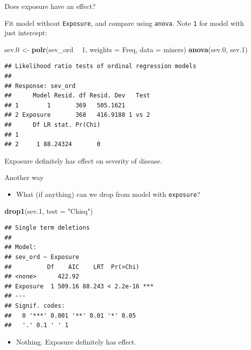 \documentclass[ignorenonframetext,]{beamer}
\newenvironment{Shaded}{\begin{snugshade}}{\end{snugshade}}
\newcommand{\DataTypeTok}[1]{\textcolor[rgb]{0.13,0.29,0.53}{#1}}
\newcommand{\DecValTok}[1]{\textcolor[rgb]{0.00,0.00,0.81}{#1}}
\newcommand{\FloatTok}[1]{\textcolor[rgb]{0.00,0.00,0.81}{#1}}
\newcommand{\KeywordTok}[1]{\textcolor[rgb]{0.13,0.29,0.53}{\textbf{#1}}}
\newcommand{\NormalTok}[1]{#1}
\newcommand{\OperatorTok}[1]{\textcolor[rgb]{0.81,0.36,0.00}{\textbf{#1}}}
\newcommand{\StringTok}[1]{\textcolor[rgb]{0.31,0.60,0.02}{#1}}
\providecommand{\tightlist}{%
  \setlength{\itemsep}{0pt}\setlength{\parskip}{0pt}}
\begin{document}
\begin{frame}[fragile]{Does exposure have an effect?}
\protect\hypertarget{does-exposure-have-an-effect}{}

Fit model without \texttt{Exposure}, and compare using \texttt{anova}.
Note \texttt{1} for model with just intercept:

\small

\begin{Shaded}
\begin{Highlighting}[]
\NormalTok{sev}\FloatTok{.0}\NormalTok{ <-}\StringTok{ }\KeywordTok{polr}\NormalTok{(sev_ord }\OperatorTok{~}\StringTok{ }\DecValTok{1}\NormalTok{, }\DataTypeTok{weights =}\NormalTok{ Freq, }\DataTypeTok{data =}\NormalTok{ miners)}
\KeywordTok{anova}\NormalTok{(sev}\FloatTok{.0}\NormalTok{, sev}\FloatTok{.1}\NormalTok{)}
\end{Highlighting}
\end{Shaded}

\begin{verbatim}
## Likelihood ratio tests of ordinal regression models
## 
## Response: sev_ord
##      Model Resid. df Resid. Dev   Test
## 1        1       369   505.1621       
## 2 Exposure       368   416.9188 1 vs 2
##      Df LR stat. Pr(Chi)
## 1                       
## 2     1 88.24324       0
\end{verbatim}

\normalsize

Exposure definitely has effect on severity of disease.

\end{frame}

\begin{frame}[fragile]{Another way}
\protect\hypertarget{another-way}{}

\begin{itemize}
\tightlist
\item
  What (if anything) can we drop from model with \texttt{exposure}?
\end{itemize}

\begin{Shaded}
\begin{Highlighting}[]
\KeywordTok{drop1}\NormalTok{(sev}\FloatTok{.1}\NormalTok{, }\DataTypeTok{test =} \StringTok{"Chisq"}\NormalTok{)}
\end{Highlighting}
\end{Shaded}

\begin{verbatim}
## Single term deletions
## 
## Model:
## sev_ord ~ Exposure
##          Df    AIC    LRT  Pr(>Chi)    
## <none>      422.92                     
## Exposure  1 509.16 88.243 < 2.2e-16 ***
## ---
## Signif. codes:  
##   0 '***' 0.001 '**' 0.01 '*' 0.05
##   '.' 0.1 ' ' 1
\end{verbatim}

\begin{itemize}
\tightlist
\item
  Nothing. Exposure definitely has effect.
\end{itemize}

\end{frame}
\end{document}
